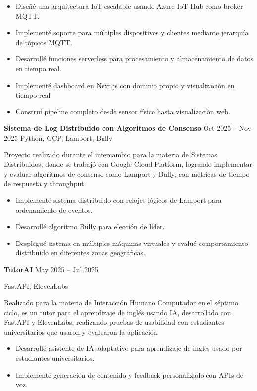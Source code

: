 \documentclass[11pt]{article}
\begin{document}
\begin{itemize}[noitemsep]

\item Diseñé una arquitectura IoT escalable usando Azure IoT Hub como broker MQTT.
\item Implementé soporte para múltiples dispositivos y clientes mediante jerarquía de tópicos MQTT.
\item Desarrollé funciones serverless para procesamiento y almacenamiento de datos en tiempo real.
\item Implementé dashboard en Next.js con dominio propio y visualización en tiempo real.
\item Construí pipeline completo desde sensor físico hasta visualización web.
\end{itemize}

\textbf{Sistema de Log Distribuido con Algoritmos de Consenso} \hfill Oct 2025 – Nov 2025
Python, GCP, Lamport, Bully


Proyecto realizado durante el intercambio para la materia de Sistemas Distribuidos, donde se trabajó con Google Cloud Platform, logrando implementar y evaluar algoritmos de consenso como Lamport y Bully, con métricas de tiempo de respuesta y throughput.

\begin{itemize}[noitemsep]
\item Implementé sistema distribuido con relojes lógicos de Lamport para ordenamiento de eventos.
\item Desarrollé algoritmo Bully para elección de líder.
\item Desplegué sistema en múltiples máquinas virtuales y evalué comportamiento distribuido en diferentes zonas geográficas.
\end{itemize}

\textbf{TutorAI} \hfill May 2025 – Jul 2025

FastAPI, ElevenLabs

Realizado para la materia de Interacción Humano Computador en el séptimo ciclo, es un tutor para el aprendizaje de inglés usando IA, desarrollado con FastAPI y ElevenLabs, realizando pruebas de usabilidad con estudiantes universitarios que usaron y evaluaron la aplicación.

\begin{itemize}[noitemsep]
\item Desarrollé asistente de IA adaptativo para aprendizaje de inglés usado por estudiantes universitarios.
\item Implementé generación de contenido y feedback personalizado con APIs de voz.
\end{itemize}
\end{document}
